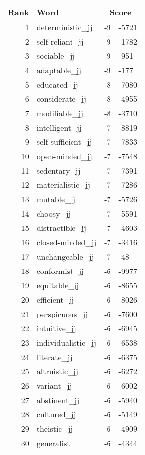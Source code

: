 \begin{longtable}[!htbp]{| rlr@{.}l |}
    \hline
    \textbf{Rank} & \textbf{Word} & \multicolumn{2}{c|}{\textbf{Score}} \\
    \hline
    \endhead
    1 & deterministic\_jj & -9 & -5721 \\
    2 & self-reliant\_jj & -9 & -1782 \\
    3 & sociable\_jj & -9 & -951 \\
    4 & adaptable\_jj & -9 & -177 \\
    5 & educated\_jj & -8 & -7080 \\
    6 & considerate\_jj & -8 & -4955 \\
    7 & modifiable\_jj & -8 & -3710 \\
    8 & intelligent\_jj & -7 & -8819 \\
    9 & self-sufficient\_jj & -7 & -7833 \\
    10 & open-minded\_jj & -7 & -7548 \\
    11 & sedentary\_jj & -7 & -7391 \\
    12 & materialistic\_jj & -7 & -7286 \\
    13 & mutable\_jj & -7 & -5726 \\
    14 & choosy\_jj & -7 & -5591 \\
    15 & distractible\_jj & -7 & -4603 \\
    16 & closed-minded\_jj & -7 & -3416 \\
    17 & unchangeable\_jj & -7 & -48 \\
    18 & conformist\_jj & -6 & -9977 \\
    19 & equitable\_jj & -6 & -8655 \\
    20 & efficient\_jj & -6 & -8026 \\
    21 & perspicuous\_jj & -6 & -7600 \\
    22 & intuitive\_jj & -6 & -6945 \\
    23 & individualistic\_jj & -6 & -6538 \\
    24 & literate\_jj & -6 & -6375 \\
    25 & altruistic\_jj & -6 & -6272 \\
    26 & variant\_jj & -6 & -6002 \\
    27 & abstinent\_jj & -6 & -5940 \\
    28 & cultured\_jj & -6 & -5149 \\
    29 & theistic\_jj & -6 & -4909 \\
    30 & generalist & -6 & -4344 \\

\end{longtable}
